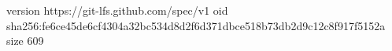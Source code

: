version https://git-lfs.github.com/spec/v1
oid sha256:fe6ce45de6cf4304a32bc534d8d2f6d371dbce518b73db2d9c12c8f917f5152a
size 609
